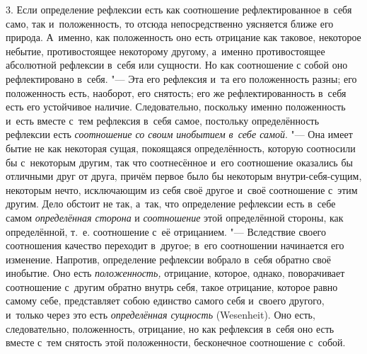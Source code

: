 3. Если определение рефлексии есть как соотношение рефлектированное в~себя
само, так и~положенность, то отсюда непосредственно уясняется ближе его
природа. А~именно, как положенность оно есть отрицание как таковое,
некоторое небытие, противостоящее некоторому другому, а~именно
противостоящее абсолютной рефлексии в~себя или сущности. Но как соотношение
с собой оно рефлектировано в~себя. "--- Эта его рефлексия и~та его положенность
разны; его положенность есть, наоборот, его снятость; его же
рефлектированность в~себя есть его устойчивое наличие. Следовательно,
поскольку именно положенность и~есть вместе с~тем рефлексия в~себя самое,
постольку определённость рефлексии есть
{\em соотношение со своим инобытием в~себе самой}. "---
Она имеет бытие не как некоторая сущая, покоящаяся определённость, которую
соотносили бы с~некоторым другим, так что соотнесённое и~его соотношение
оказались бы отличными друг от друга, причём первое было бы некоторым
внутри-себя-сущим, некоторым нечто, исключающим из себя своё другое и~своё
соотношение с~этим другим. Дело обстоит не так, а~так, что определение
рефлексии есть в~себе самом {\em определённая сторона}
и {\em соотношение} этой определённой стороны, как
определённой, т.~е. соотношение с~её отрицанием. "--- Вследствие своего
соотношения качество переходит в~другое; в~его соотношении начинается его
изменение. Напротив, определение рефлексии вобрало в~себя обратно своё
инобытие. Оно есть {\em положенность,} отрицание,
которое, однако, поворачивает соотношение с~другим обратно внутрь себя,
такое отрицание, которое равно самому себе, представляет собою единство
самого себя и~своего другого, и~только через это есть
{\em определённая сущность} (Wesenheit). Оно есть,
следовательно, положенность, отрицание, но как рефлексия в~себя оно есть
вместе с~тем снятость этой положенности, бесконечное соотношение с~собой.

